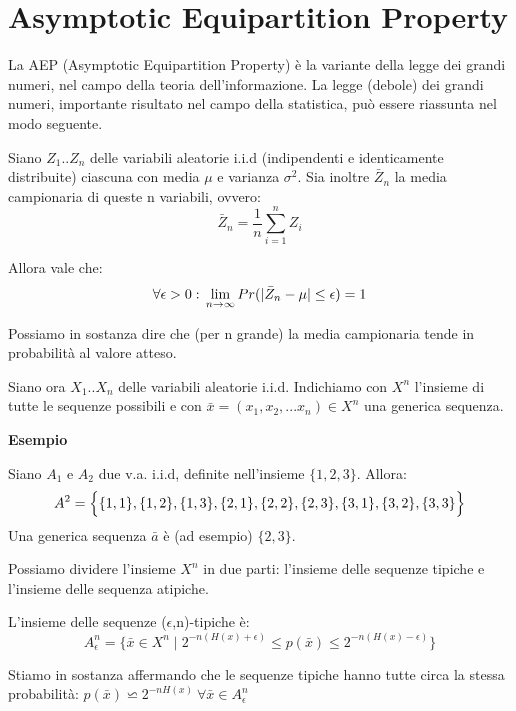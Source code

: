 \section{Asymptotic Equipartition Property}
\label{aep}
La AEP (Asymptotic Equipartition Property) è la variante della legge dei grandi numeri, nel campo della teoria dell'informazione.
La legge (debole) dei grandi numeri, importante risultato nel campo della statistica, può essere riassunta nel modo seguente.

Siano $Z_1..Z_n$ delle variabili aleatorie i.i.d (indipendenti e identicamente distribuite) ciascuna con media $\mu$ e varianza $\sigma^2$.
Sia inoltre $\bar{Z}_n$ la media campionaria di queste n variabili, ovvero:
\[
 \bar{Z}_n=\frac{1}{n} \sum_{i=1}^n Z_i
\]

Allora vale che:
\[
 \forall \epsilon > 0: \\
 \lim_{n\to\infty}Pr(|\bar{Z}_n-\mu|\le \epsilon)=1
\]

Possiamo in sostanza dire che (per n grande) la media campionaria tende in probabilità al valore atteso.

Siano ora $X_1..X_n$ delle variabili aleatorie i.i.d. Indichiamo con $X^n$ l'insieme di tutte le sequenze possibili e con $\bar{x}=(x_1,x_2,...x_n) \in X^n $ una generica sequenza.

\bigskip
\noindent
\textbf{Esempio}

\noindent
Siano $A_1$ e $A_2$ due v.a. i.i.d, definite nell'insieme $\{1,2,3\}$.
Allora:
\[
 A^2=\Bigl \lbrace \{1,1\},\{1,2\},\{1,3\},\{2,1\},\{2,2\},\{2,3\},\{3,1\},\{3,2\},\{3,3\} \Bigl \rbrace
\]
Una generica sequenza $\bar{a}$ è (ad esempio) $\{2,3\}$.

\bigskip
Possiamo dividere l'insieme $X^n$ in due parti: l'insieme delle sequenze tipiche e l'insieme delle sequenza atipiche.

\begin{definizione}
 L'insieme delle sequenze ($\epsilon$,n)-tipiche è:
\[
 A_{\epsilon}^n=\{ \bar{x} \in X^n \mid 2^{-n(H(x)+\epsilon)} \le p(\bar{x}) \le 2^{-n(H(x)-\epsilon)} \}
\]
\label{tipiche}
\end{definizione}

\noindent
Stiamo in sostanza affermando che le sequenze tipiche hanno tutte circa la stessa probabilità: 
$p(\bar{x}) \backsimeq 2^{-nH(x)} \ \forall \bar{x} \in A_{\epsilon}^n$

